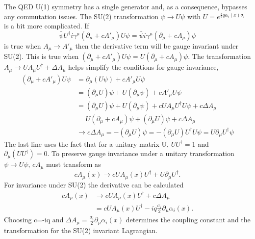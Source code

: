 The QED U(1) symmetry has a single generator and, as a consequence, bypasses any commutation issues. The SU(2) transformation $\psi \rightarrow U\psi$ with $U = e^{\frac{i}{2}q\alpha_i(x)\sigma_i}$ is a bit more complicated. If 
\begin{equation}
\bar{\psi}U^\dagger i\gamma^\mu\left(\partial_\mu + cA'_{\mu}\right)U\psi = \bar{\psi}i\gamma^\mu\left(\partial_\mu + cA_{\mu}\right)\psi 
\end{equation}
is true when $A_\mu \rightarrow A'_\mu$ then the derivative term will be gauge invariant under SU(2). This is true when $\left(\partial_\mu + cA'_{\mu}\right)U\psi =U\left(\partial_\mu + cA_{\mu}\right)\psi$. The transformation $A_\mu \rightarrow UA_\mu U^\dagger + \Delta A_{\mu}$ helps simplify the conditions for gauge invariance, 
\begin{equation}
\begin{split}
\left(\partial_\mu + cA'_{\mu}\right)U\psi &=  \partial_\mu(U\psi) + cA'_{\mu}U\psi \\
& = (\partial_\mu U)\psi + U(\partial_\mu\psi) + cA'_{\mu}U\psi \\ 
& = (\partial_\mu U)\psi + U(\partial_\mu\psi) + cUA_{\mu}U^\dagger U\psi + c\Delta A_{\mu} \\
& = U\left(\partial_\mu + cA_{\mu}\right)\psi + (\partial_\mu U)\psi + c\Delta A_{\mu} \\
& \rightarrow c\Delta A_{\mu} = -(\partial_\mu U)\psi = - (\partial_\mu U)U^\dagger U\psi = U\partial_\mu U^\dagger\psi
\end{split}
\end{equation}
The last line uses the fact that for a unitary matrix U, $UU^\dagger = 1$ and $\partial_\mu(UU^\dagger) = 0$. To preserve gauge invariance under a unitary transformation $\psi \rightarrow U\psi$, $cA_\mu$ must transform as
\begin{equation}
cA_\mu(x) \rightarrow cUA_\mu(x)U^\dagger + U\partial_\mu U^\dagger .
\end{equation}
For invariance under SU(2) the derivative can be calculated
\begin{equation}
\begin{split}
cA_\mu(x) &\rightarrow cUA_\mu(x)U^\dagger + c\Delta A_\mu \\ 
&= cUA_\mu(x)U^\dagger - iq\frac{\sigma_i}{2}\partial_\mu\alpha_i(x).
\end{split}
\end{equation}
Choosing c=-iq and $\Delta A_\mu = \frac{\sigma_i}{2}\partial_\mu\alpha_i(x)$ determines the coupling constant and the transformation for the SU(2) invariant Lagrangian.

